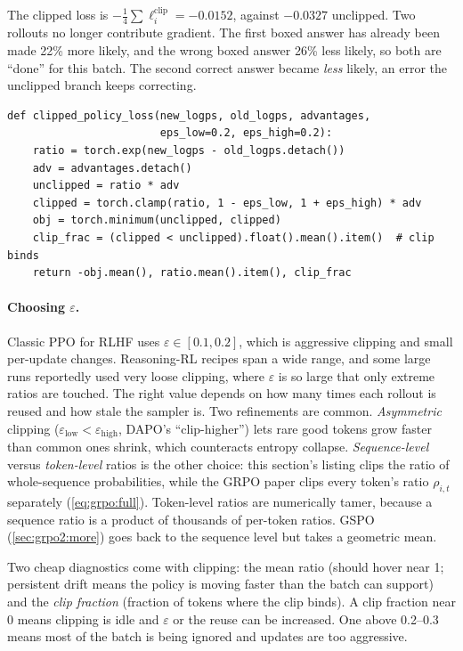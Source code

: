 The clipped loss is $-\frac14\sum\ell^{\text{clip}}_i=-0.0152$, against $-0.0327$
unclipped. Two rollouts no longer contribute gradient. The first boxed answer has already
been made 22\% more likely, and the wrong boxed answer 26\% less likely, so both are
``done'' for this batch. The second correct answer became \emph{less} likely, an error
the unclipped branch keeps correcting.

\begin{lstlisting}[caption={Policy ratios and the clipped loss (sequence level, as in this section).},label={lst:grpo2:clip}]
def clipped_policy_loss(new_logps, old_logps, advantages,
                        eps_low=0.2, eps_high=0.2):
    ratio = torch.exp(new_logps - old_logps.detach())
    adv = advantages.detach()
    unclipped = ratio * adv
    clipped = torch.clamp(ratio, 1 - eps_low, 1 + eps_high) * adv
    obj = torch.minimum(unclipped, clipped)
    clip_frac = (clipped < unclipped).float().mean().item()  # clip binds
    return -obj.mean(), ratio.mean().item(), clip_frac
\end{lstlisting}

\paragraph{Choosing $\varepsilon$.} Classic PPO for RLHF uses $\varepsilon\in[0.1,0.2]$,
which is aggressive clipping and small per-update changes. Reasoning-RL recipes span a wide
range, and some large runs reportedly used very loose clipping, where $\varepsilon$ is so large
that only extreme ratios are touched. The right value depends on how many times each rollout
is reused and how stale the sampler is. Two refinements are common. \emph{Asymmetric} clipping
($\varepsilon_{\text{low}}<\varepsilon_{\text{high}}$, DAPO's ``clip-higher'') lets rare good
tokens grow faster than common ones shrink, which counteracts entropy collapse.
\emph{Sequence-level} versus \emph{token-level} ratios is the other choice: this section's
listing clips the ratio of whole-sequence probabilities, while the GRPO paper clips every
token's ratio $\rho_{i,t}$ separately (\cref{eq:grpo:full}). Token-level ratios are numerically
tamer, because a sequence ratio is a product of thousands of per-token ratios. GSPO
(\cref{sec:grpo2:more}) goes back to the sequence level but takes a geometric mean.

\begin{keyidea}
Two cheap diagnostics come with clipping: the mean ratio (should hover near 1; persistent
drift means the policy is moving faster than the batch can support) and the
\emph{clip fraction} (fraction of tokens where the clip binds). A clip fraction near 0
means clipping is idle and $\varepsilon$ or the reuse can be increased. One above 0.2--0.3
means most of the batch is being ignored and updates are too aggressive.
\end{keyidea}

